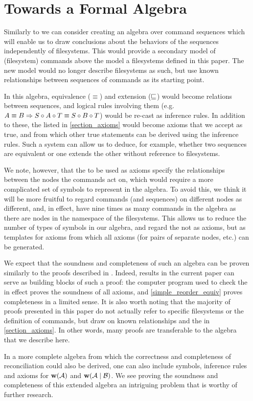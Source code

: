 
\section{Towards a Formal Algebra}\label{sec_algebra}

Similarly to \cite{NREC} we can consider creating an algebra over command sequences
which will enable us to draw conclusions about the behaviors of the sequences
independently of filesystems.
This would provide a secondary model of (filesystem) commands above the model a filesystems
defined in this paper. The new model would no longer describe filesystems as such,
but use known relationships between sequences of commands as its starting point.

In this algebra, equivalence ($\equiv$) and extension ($\sqsubseteq$) would become relations
between sequences, and logical rules involving them
(e.g. $ A\equiv B \Rightarrow S\circ A\circ T\equiv S\circ B\circ T $) would be re-cast as inference rules.
In addition to these, the  listed in \cref{section_axioms}
would become axioms that we accept as true, and from which other true statements can be derived
using the inference rules.
Such a system can allow us to deduce, for example, whether two sequences are equivalent
or one extends the other
without reference to filesystems.

We note, however, that the  to be used as axioms 
specify the relationships between the nodes
the commands act on, which would require a more complicated set of symbols to represent
in the algebra.
To avoid this, we think it will be more fruitful to regard commands (and sequences)
on different nodes as different, and, in effect, have nine times as many commands 
in the algebra as there are nodes in the namespace of the filesystems.
This allows us to reduce the number of types of symbols in our algebra, and regard
the  not as axioms, but as templates for axioms
from which all axioms (for pairs of separate nodes, etc.) can be generated.

We expect that the soundness and completeness of such an algebra can be proven
similarly to the proofs described in \cite{NREC}.
Indeed, results in the current paper can serve as building blocks of such a proof:
the computer program used to check the 
in effect proves the soundness of all axioms,
and \cref{simple_reorder_equiv} proves completeness in a limited sense.
It is also worth noting that the majority of proofs presented in this paper
do not actually refer to specific filesystems or the definition of commands,
but draw on known relationships and the
 in \cref{section_axioms}.
In other words, many proofs are transferable to the algebra that we describe here.

In a more complete algebra from which the correctness and completeness
of reconciliation could also be derived,
one can also include symbols, inference rules and axioms for 
$\mathbf{w}({\mathcal{A}})$ and $\mathbf{w}({\mathcal{A}}\mathrel{|}{\mathcal{B}})$.
We see proving the soundness and completeness of this extended algebra
an intriguing problem that is worthy of further research.
